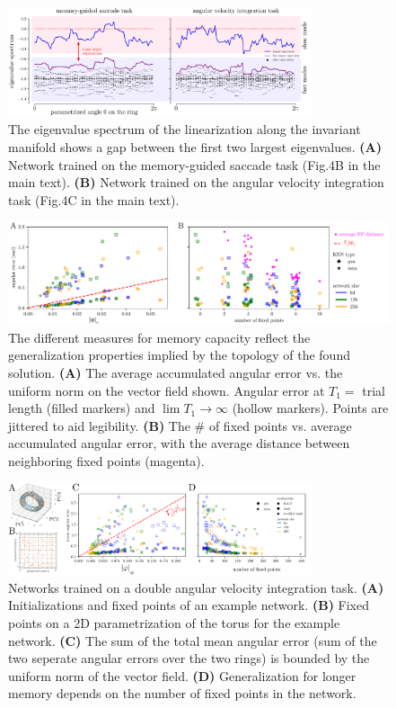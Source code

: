 \documentclass[letterpaper]{article}
\begin{document}
\begin{figure}[tbhp]
  \centering
  \includegraphics[width=0.8\textwidth]{eigenvalue_gap}
  \caption{The eigenvalue spectrum of the linearization along the invariant manifold shows a gap between the first two largest eigenvalues.
    \textbf{(A)} Network trained on the memory-guided saccade task (Fig.4B in the main text).
    \textbf{(B)} Network trained on the angular velocity integration task (Fig.4C in the main text).
}\label{fig:eigenvalue_gap}
\end{figure}




\begin{figure}[tbhp]
  \centering
  \includegraphics[width=.8\textwidth]{angular_losses_lstm_gru}
  \caption{The different measures for memory capacity reflect the generalization properties implied by the topology of the found solution.
    \textbf{(A)} The average accumulated angular error vs. the uniform norm on the vector field shown.
     Angular error at \(T_1 =\) trial length (filled markers) and \(\lim T_{1} \to \infty\)  (hollow markers).
      Points are jittered to aid legibility.
    \textbf{(B)}  The \# of fixed points vs. average accumulated angular error, with the average distance between neighboring fixed points (magenta).
}\label{fig:angular_losses_lstm_gru}
\end{figure}



\begin{figure}[tbhp]
  \centering
  \includegraphics[width=0.8\textwidth]{davit}
  \caption{Networks trained on a double angular velocity integration task.
    \textbf{(A)} Initializations and fixed points of an example network.
    \textbf{(B)} Fixed points on a 2D parametrization of the torus for the example network.
    \textbf{(C)} The sum of the total mean angular error (sum of the two seperate angular errors over the two rings) is bounded by the uniform norm of the vector field.
    \textbf{(D)} Generalization for longer memory depends on the number of fixed points in the network.
}\label{fig:davit}
\end{figure}
\end{document}
